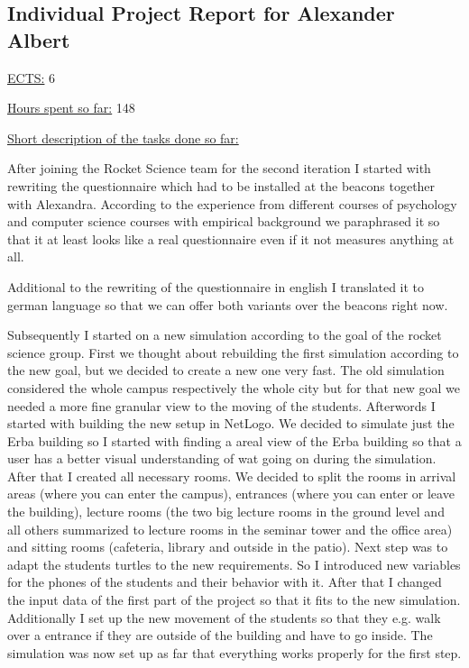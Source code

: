 \subsection{Individual Project Report for Alexander Albert}
\par \underline{ECTS:} 6
\par \underline{Hours spent so far:} 148 
\par \underline{Short description of the tasks done so far:}
\par After joining the Rocket Science team for the second iteration I started with rewriting the questionnaire which had to be installed at the beacons together with Alexandra. According to the experience from different courses of psychology and computer science courses with empirical background we  paraphrased it so that it at least looks like a real questionnaire even if it not measures anything at all.
\par Additional to the rewriting of the questionnaire in english I translated it to german language so that we can offer both variants over the beacons right now.
\par Subsequently I started on a new simulation according to the goal of the rocket science group. First we thought about rebuilding the first simulation according to the new goal, but we decided to create a new one very fast. The old simulation considered the whole campus respectively the whole city but for that new goal we needed a more fine granular view to the moving of the students. 
Afterwords I started with building the new setup in NetLogo. We decided to simulate just the Erba building so I started with finding a areal view of the Erba building so that a user has a better visual understanding of wat going on during the simulation. After that I created all necessary rooms. We decided to split the rooms in arrival areas (where you can enter the campus), entrances (where you can enter or leave the building), lecture rooms (the two big lecture rooms in the ground level and all others summarized to lecture rooms in the seminar tower and the office area) and sitting rooms (cafeteria, library and outside in the patio). Next step was to adapt the students turtles to the new requirements. So I introduced new variables for the phones of the students and their behavior with it. After that I changed the input data of the first part of the project so that it fits to the new simulation. Additionally I set up the new movement of the students so that they e.g. walk over a entrance if they are outside of the building and have to go inside. The simulation was now set up as far that everything works properly for the first step.
